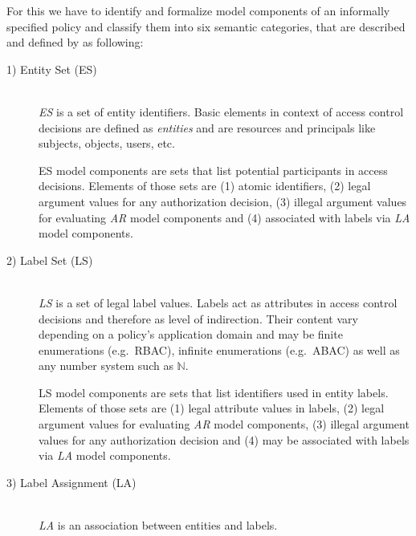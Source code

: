 \documentclass[twoside, openright, 12pt]{book}
\begin{document}
For this we have to identify and formalize model components of an informally specified policy and classify them into six semantic categories, that are described and defined by \cite{Amthor18} as following:

\begin{description}
\item[1) Entity Set (ES)]\hfill \\
\textit{ES} is a set of entity identifiers.
Basic elements in context of access control decisions are defined as \textit{entities} and are resources and principals like subjects, objects, users, etc.
\vspace{-2mm}

\begin{xdefinition}[ES] 
ES model components are sets that list potential participants in access decisions.
Elements of those sets are (1) atomic identifiers, (2) legal argument values for any authorization decision, (3) illegal argument values for evaluating \textit{AR} model components and (4) associated with labels via \textit{LA} model components.
\label{definition:ES}
\end{xdefinition}

\item[2) Label Set (LS)]\hfill \\
\textit{LS} is a set of legal label values.
Labels act as attributes in access control decisions and therefore as level of indirection.
Their content vary depending on a policy's application domain and may be finite enumerations (e.g.~RBAC), infinite enumerations (e.g.~ABAC) as well as any number system such as $\mathbb{N}$.
\vspace{-2mm}

\begin{xdefinition}[LS] 
LS model components are sets that list identifiers used in entity labels.
Elements of those sets are (1) legal attribute values in labels, (2) legal argument values for evaluating \textit{AR} model components, (3) illegal argument values for any authorization decision and (4) may be associated with labels via \textit{LA} model components.
\label{definition:LS}
\end{xdefinition}



\item[3) Label Assignment (LA)]\hfill \\
\textit{LA} is an association between entities and labels.
\vspace{-2mm}


\end{description}
\end{document}
